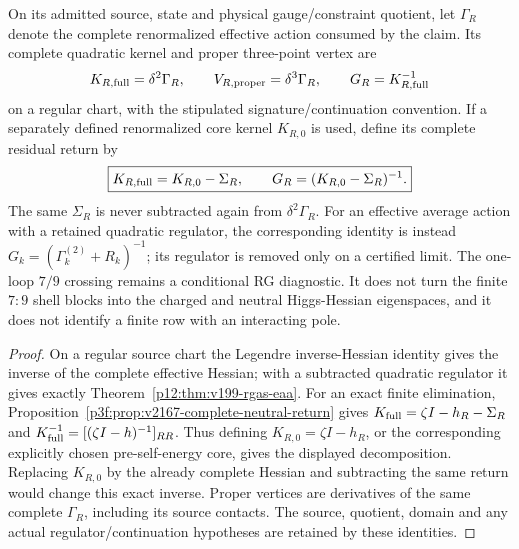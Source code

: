 \documentclass[12pt,a4paper]{article}
\begin{document}
\begin{theorem}
\label{p7:thm:v164-renormalized-response-owner}
On its admitted source, state and physical gauge/constraint quotient, let
\(\Gamma_R\) denote the complete renormalized effective action consumed
by the claim.  Its complete quadratic kernel and proper three-point vertex
are
\[
 K_{R,\rm full}=\delta^2\Gamma_R,
 \qquad V_{R,\rm proper}=\delta^3\Gamma_R,
 \qquad G_R=K_{R,\rm full}^{-1}
\]
on a regular chart, with the stipulated signature/continuation convention.
If a separately defined renormalized core kernel \(K_{R,0}\) is used,
define its complete residual return by
\[
 \boxed{K_{R,\rm full}=K_{R,0}-\Sigma_R,
 \qquad G_R=(K_{R,0}-\Sigma_R)^{-1}.}
\]
The same \(\Sigma_R\) is never subtracted again from
\(\delta^2\Gamma_R\).  For an effective average action with a retained
quadratic regulator, the corresponding identity is instead
\(G_k=(\Gamma_k^{(2)}+R_k)^{-1}\); its regulator is removed only on a
certified limit.
The one-loop \(7/9\) crossing remains a conditional RG diagnostic.  It does
not turn the finite \(7:9\) shell blocks into the charged and neutral
Higgs-Hessian eigenspaces, and it does not identify a finite row with an
interacting pole.
\end{theorem}
\begin{proof}
On a regular source chart the Legendre inverse-Hessian identity gives the
inverse of the complete effective Hessian; with a subtracted quadratic
regulator it gives exactly
Theorem~\ref{p12:thm:v199-rgas-eaa}.  For an exact finite elimination,
Proposition~\ref{p3f:prop:v2167-complete-neutral-return} gives
\(K_{\rm full}=\zeta I-h_R-\Sigma_R\) and
\(K_{\rm full}^{-1}=[(\zeta I-h)^{-1}]_{RR}\).
Thus defining \(K_{R,0}=\zeta I-h_R\), or the corresponding explicitly
chosen pre-self-energy core, gives the displayed decomposition.  Replacing
\(K_{R,0}\) by the already complete Hessian and subtracting the same
return would change this exact inverse.  Proper vertices are derivatives
of the same complete \(\Gamma_R\), including its source contacts.
The source, quotient, domain and any actual regulator/continuation hypotheses
are retained by these identities.
\end{proof}
\end{document}
